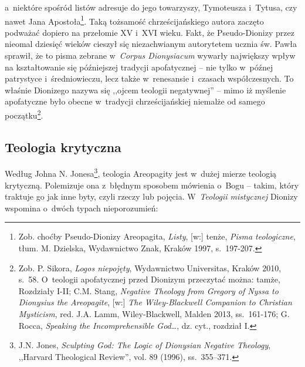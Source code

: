 a~niektóre spośród listów adresuje do jego towarzyszy, Tymoteusza i~Tytusa, czy nawet Jana Apostoła\footnote{Zob. choćby Pseudo-Dionizy Areopagita, \textit{Listy}, [w:] tenże, \textit{Pisma teologiczne}, tłum. M. Dzielska, Wydawnictwo Znak, Kraków 1997, s.~197-207.}. Taką tożsamość chrześcijańskiego autora zaczęto podważać dopiero na przełomie XV i~XVI wieku. Fakt, że Pseudo-Dionizy przez nieomal dziesięć wieków cieszył się niezachwianym autorytetem ucznia św. Pawła sprawił, że to pisma zebrane w~\textit{Corpus Dionysiacum} wywarły największy wpływ na kształtowanie się późniejszej tradycji apofatycznej -- nie tylko w~późnej patrystyce i~średniowieczu, lecz także w~renesansie i~czasach współczesnych. To właśnie Dionizego nazywa się ,,ojcem teologii negatywnej'' -- mimo iż myślenie apofatyczne było obecne w~tradycji chrześcijańskiej niemalże od samego początku\footnote{Zob. P. Sikora, \textit{Logos niepojęty}, Wydawnictwo Universitas, Kraków 2010, s.~58. O~teologii apofatycznej przed Dionizym przeczytać można: tamże, Rozdziały I-II; C.M. Stang, \textit{Negative Theology from Gregory of Nyssa to Dionysius the Areopagite}, [w:] \textit{The Wiley-Blackwell Companion to Christian Mysticism}, red. J.A. Lamm, Wiley-Blackwell, Malden 2013, ss.~161-176; G. Rocca, \textit{Speaking the Incomprehensible God}\ldots, dz. cyt., rozdział I.}.


\subsection*{Teologia krytyczna}

Według Johna N. Jonesa\footnote{J.N. Jones, \textit{Sculpting God: The Logic of Dionysian Negative Theology}, ,,Harvard Theological Review'', vol. 89 (1996), ss.~355–371.}, teologia Areopagity jest w~dużej mierze teologią krytyczną. Polemizuje ona z~błędnym sposobem mówienia o~Bogu -- takim, który traktuje go jak inne byty, czyli rzeczy lub pojęcia. W~\textit{Teologii mistycznej} Dionizy wspomina o~dwóch typach nieporozumień:

